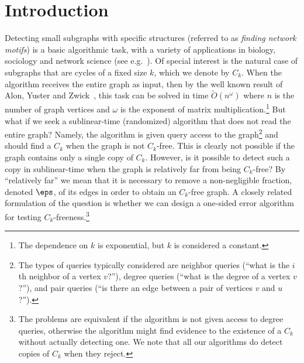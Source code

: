 \section{Introduction}\label{sec:intro}
Detecting small subgraphs with  specific structures  (referred to as \emph{finding network motifs}) is a basic algorithmic task, with a variety of applications in biology, sociology and network science (see e.g.~\cite{HoLe70, Co88, portes2000social, EcMo02, burt2004structural, milo2002network, alon2007network, foucault2010friend, BerryHLP11, SeKoPi11, JRT12}). 
Of special  interest is the natural %
case of subgraphs that are cycles of a fixed size $k$, which we denote by $C_k$.
When the algorithm receives the entire graph as input, then by the well known %
result of Alon, Yuster and Zwick~\cite{AYZ}, this task can be solved in  time $\widetilde{O}(n^{\omega})$ 
where $n$ is the number of graph vertices and $\omega$ is the exponent of matrix multiplication.\footnote{The dependence on $k$ is exponential, but $k$ is considered a constant.}
But what if we seek a sublinear-time (randomized) algorithm that does not read the entire graph? Namely, the algorithm is given  query access to the graph\footnote{\label{foot:queries} The  types of queries typically considered are neighbor queries (``what is the $i$th neighbor of a vertex $v$?''), degree queries (``what is the degree of a vertex $v$?''), and pair queries (``is there an edge between a pair of vertices $v$ and $u$?'').} %
and should find a $C_k$ when the graph is not $C_k$-free.
This is clearly not possible if the graph contains only a single copy of $C_k$. 
However, is it possible to detect such a copy in sublinear-time when the graph is relatively far from being $C_k$-free?
By ``relatively far'' we mean that it is necessary to remove a non-negligible fraction, denoted $\eps$, of its edges in order to obtain an $C_k$-free graph. %
A closely related formulation of the question is whether we can design a one-sided error algorithm for testing $C_k$-freeness.\footnote{The problems are equivalent if the algorithm is not given access to degree queries, otherwise the algorithm might find evidence to the existence of a $C_k$ without actually detecting one. We note that all our algorithms do detect copies of $C_k$ when they reject.}


